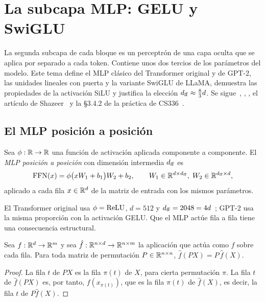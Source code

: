 \chapter{La subcapa MLP: GELU y SwiGLU}
\label{tema:3}

La segunda subcapa de cada bloque es un perceptrón de una capa oculta que se aplica por separado a cada token. Contiene unos dos tercios de los parámetros del modelo. Este tema define el MLP clásico del Transformer original y de GPT-2, las unidades lineales con puerta y la variante SwiGLU de LLaMA, demuestra las propiedades de la activación SiLU y justifica la elección $d_{\mathrm{ff}}\approx\frac83 d$. Se sigue~\cite[§3.3]{vaswani}, \cite[§11.7.2]{d2l}, \cite[§7.2.1]{jm3}, el artículo de Shazeer~\cite{shazeer} y la §3.4.2 de la práctica de CS336~\cite{cs336}.

\section{El MLP posición a posición}

\begin{definicion}\label{def:ffn}
Sea $\phi:\mathbb{R}\to\mathbb{R}$ una función de activación aplicada componente a componente. El \emph{MLP posición a posición} con dimensión intermedia $d_{\mathrm{ff}}$ es
\[
\operatorname{FFN}(x)=\phi\bigl(xW_1+b_1\bigr)W_2+b_2,\qquad W_1\in\mathbb{R}^{d\times d_{\mathrm{ff}}},\;W_2\in\mathbb{R}^{d_{\mathrm{ff}}\times d},
\]
aplicado a cada fila $x\in\mathbb{R}^{d}$ de la matriz de entrada con los mismos parámetros.
\end{definicion}

El Transformer original usa $\phi=\operatorname{ReLU}$, $d=512$ y $d_{\mathrm{ff}}=2048=4d$~\cite[§3.3]{vaswani}; GPT-2 usa la misma proporción con la activación GELU. Que el MLP actúe fila a fila tiene una consecuencia estructural.

\begin{lema}\label{lem:filas}
Sea $f:\mathbb{R}^{d}\to\mathbb{R}^{m}$ y sea $\hat f:\mathbb{R}^{n\times d}\to\mathbb{R}^{n\times m}$ la aplicación que actúa como $f$ sobre cada fila. Para toda matriz de permutación $P\in\mathbb{R}^{n\times n}$, $\hat f(PX)=P\,\hat f(X)$.
\end{lema}

\begin{proof}
La fila $t$ de $PX$ es la fila $\pi(t)$ de $X$, para cierta permutación $\pi$. La fila $t$ de $\hat f(PX)$ es, por tanto, $f(x_{\pi(t)})$, que es la fila $\pi(t)$ de $\hat f(X)$, es decir, la fila $t$ de $P\hat f(X)$.
\end{proof}

